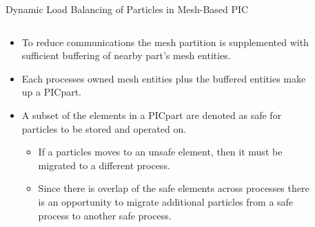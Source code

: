 \documentclass[aspectratio=169]{beamer}
\begin{document}
\begin{frame}{Dynamic Load Balancing of Particles in Mesh-Based PIC}
  \begin{columns}
    \begin{column}{0.7\linewidth}
      \begin{itemize}
      \item To reduce communications the mesh partition is supplemented with sufficient buffering of nearby part's mesh entities.
      \item Each processes owned mesh entities plus the buffered entities make up a PICpart.
      \item A subset of the elements in a PICpart are denoted as safe for particles to be stored and operated on.
        \begin{itemize}
        \item If a particles moves to an unsafe element, then it must be migrated to a different process.
        \item Since there is overlap of the safe elements across processes there is an opportunity to migrate additional particles from a safe process to another safe process.
        \end{itemize}
      \end{itemize}
    \end{column}
    \begin{column}{0.3\linewidth}
      \begin{figure}
        \centering

\end{figure}
\end{column}
\end{columns}
\end{frame}
\end{document}
